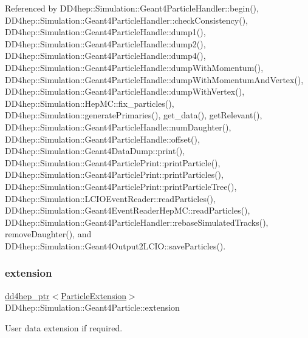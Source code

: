 Referenced by D\+D4hep\+::\+Simulation\+::\+Geant4\+Particle\+Handler\+::begin(), D\+D4hep\+::\+Simulation\+::\+Geant4\+Particle\+Handler\+::check\+Consistency(), D\+D4hep\+::\+Simulation\+::\+Geant4\+Particle\+Handle\+::dump1(), D\+D4hep\+::\+Simulation\+::\+Geant4\+Particle\+Handle\+::dump2(), D\+D4hep\+::\+Simulation\+::\+Geant4\+Particle\+Handle\+::dump4(), D\+D4hep\+::\+Simulation\+::\+Geant4\+Particle\+Handle\+::dump\+With\+Momentum(), D\+D4hep\+::\+Simulation\+::\+Geant4\+Particle\+Handle\+::dump\+With\+Momentum\+And\+Vertex(), D\+D4hep\+::\+Simulation\+::\+Geant4\+Particle\+Handle\+::dump\+With\+Vertex(), D\+D4hep\+::\+Simulation\+::\+Hep\+M\+C\+::fix\+\_\+particles(), D\+D4hep\+::\+Simulation\+::generate\+Primaries(), get\+\_\+data(), get\+Relevant(), D\+D4hep\+::\+Simulation\+::\+Geant4\+Particle\+Handle\+::num\+Daughter(), D\+D4hep\+::\+Simulation\+::\+Geant4\+Particle\+Handle\+::offset(), D\+D4hep\+::\+Simulation\+::\+Geant4\+Data\+Dump\+::print(), D\+D4hep\+::\+Simulation\+::\+Geant4\+Particle\+Print\+::print\+Particle(), D\+D4hep\+::\+Simulation\+::\+Geant4\+Particle\+Print\+::print\+Particles(), D\+D4hep\+::\+Simulation\+::\+Geant4\+Particle\+Print\+::print\+Particle\+Tree(), D\+D4hep\+::\+Simulation\+::\+L\+C\+I\+O\+Event\+Reader\+::read\+Particles(), D\+D4hep\+::\+Simulation\+::\+Geant4\+Event\+Reader\+Hep\+M\+C\+::read\+Particles(), D\+D4hep\+::\+Simulation\+::\+Geant4\+Particle\+Handler\+::rebase\+Simulated\+Tracks(), remove\+Daughter(), and D\+D4hep\+::\+Simulation\+::\+Geant4\+Output2\+L\+C\+I\+O\+::save\+Particles().

\hypertarget{class_d_d4hep_1_1_simulation_1_1_geant4_particle_a07c7467088b330c17ad7f85374273470}{}\label{class_d_d4hep_1_1_simulation_1_1_geant4_particle_a07c7467088b330c17ad7f85374273470} 
\subsubsection{\texorpdfstring{extension}{extension}}
{\footnotesize\ttfamily \hyperlink{class_d_d4hep_1_1dd4hep__ptr}{dd4hep\+\_\+ptr}$<$\hyperlink{class_d_d4hep_1_1_simulation_1_1_particle_extension}{Particle\+Extension}$>$ D\+D4hep\+::\+Simulation\+::\+Geant4\+Particle\+::extension}



User data extension if required. 



